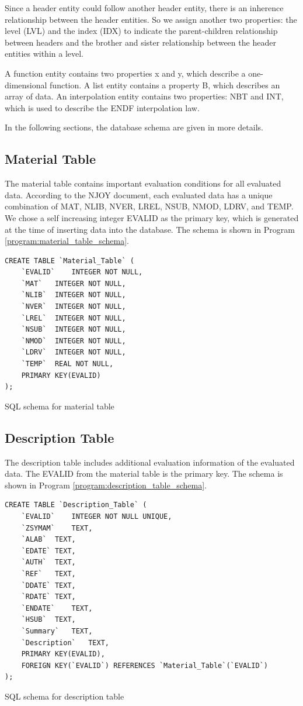 Since a header entity could follow another header entity, there is an inherence relationship between the header entities. So we assign another two properties: the level (LVL) and the index (IDX) to indicate the parent-children relationship between headers and the brother and sister relationship between the header entities within a level. 

A function entity contains two properties x and y, which describe a one-dimensional function. A list entity contains a property B, which describes an array of data. An interpolation entity contains two properties: NBT and INT, which is used to describe the ENDF interpolation law. 

In the following sections, the database schema are given in more details.

\subsection{Material Table}
The material table contains important evaluation conditions for all evaluated data. According to the NJOY document, each evaluated data has a unique combination of MAT, NLIB, NVER, LREL, NSUB, NMOD, LDRV, and TEMP. We chose a self increasing integer EVALID as the primary key, which is generated at the time of inserting data into the database. The schema is shown in Program \ref{program:material_table_schema}.
\begin{program}[!htb]
\centering
\begin{verbatim} 
CREATE TABLE `Material_Table` (
	`EVALID`	INTEGER NOT NULL,
	`MAT`	INTEGER NOT NULL,
	`NLIB`	INTEGER NOT NULL,
	`NVER`	INTEGER NOT NULL,
	`LREL`	INTEGER NOT NULL,
	`NSUB`	INTEGER NOT NULL,
	`NMOD`	INTEGER NOT NULL,
	`LDRV`	INTEGER NOT NULL,
	`TEMP`	REAL NOT NULL,
	PRIMARY KEY(EVALID)
);
\end{verbatim}
\caption{ \label{program:material_table_schema}
SQL schema for material table}
\end{program}

\subsection{Description Table}
The description table includes additional evaluation information of the evaluated data. The EVALID from the material table is the primary key. The schema is shown in Program \ref{program:description_table_schema}.
\begin{program}[!htb]
\centering
\begin{verbatim} 
CREATE TABLE `Description_Table` (
	`EVALID`	INTEGER NOT NULL UNIQUE,
	`ZSYMAM`	TEXT,
	`ALAB`	TEXT,
	`EDATE`	TEXT,
	`AUTH`	TEXT,
	`REF`	TEXT,
	`DDATE`	TEXT,
	`RDATE`	TEXT,
	`ENDATE`	TEXT,
	`HSUB`	TEXT,
	`Summary`	TEXT,
	`Description`	TEXT,
	PRIMARY KEY(EVALID),
	FOREIGN KEY(`EVALID`) REFERENCES `Material_Table`(`EVALID`)
);
\end{verbatim}
\caption{ \label{program:description_table_schema}
SQL schema for description table}
\end{program}

